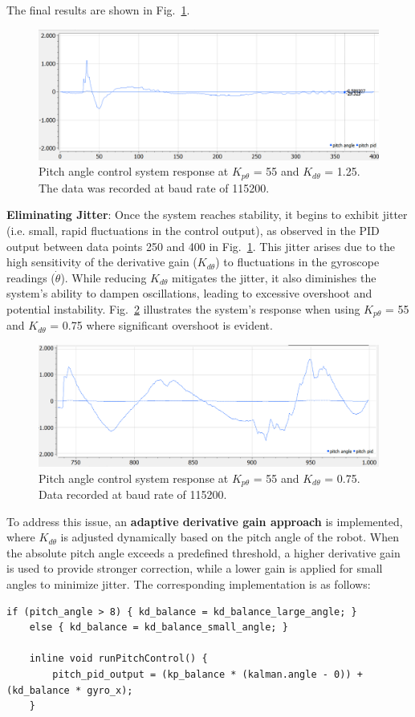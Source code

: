 The final results are shown in Fig.~\ref{fig:pid_position_kp_55_kd_1_25}.
\begin{figure}[H]
	\centering
	\includegraphics[width=0.8\linewidth]{assets/pid_pitch_kp_55_kd_1_25.png}
	\caption{Pitch angle control system response at $K_{p\theta}$ = 55 and $K_{d\theta}$ = 1.25. The data was recorded at baud rate of 115200.}
	\label{fig:pid_position_kp_55_kd_1_25}
\end{figure}

\textbf{Eliminating Jitter}:
Once the system reaches stability, it begins to exhibit jitter (i.e. small, rapid fluctuations in the control output), as observed in the PID output between data points 250 and 400 in Fig.~\ref{fig:pid_position_kp_55_kd_1_25}. This jitter arises due to the high sensitivity of the derivative gain ($K_{d\theta}$) to fluctuations in the gyroscope readings ($\dot{\theta}$). While reducing $K_{d\theta}$ mitigates the jitter, it also diminishes the system's ability to dampen oscillations, leading to excessive overshoot and potential instability. Fig.~\ref{fig:pid_position_overshoot} illustrates the system's response when using $K_{p\theta}$ = 55 and $K_{d\theta}$ = 0.75 where significant overshoot is evident.

\begin{figure}[H]
	\centering
	\includegraphics[width=0.7\linewidth]{assets/pid_pitch_overshoot.png}
	\caption{Pitch angle control system response at $K_{p\theta}$ = 55 and $K_{d\theta}$ = 0.75. Data recorded at baud rate of 115200.}
	\label{fig:pid_position_overshoot}
\end{figure}

To address this issue, an \textbf{adaptive derivative gain approach} is implemented, where $K_{d\theta}$ is adjusted dynamically based on the pitch angle of the robot. When the absolute pitch angle exceeds a predefined threshold, a higher derivative gain is used to provide stronger correction, while a lower gain is applied for small angles to minimize jitter. The corresponding implementation is as follows:
\begin{lstlisting}[style=cppstyle2]
	if (pitch_angle > 8) { kd_balance = kd_balance_large_angle; }
	else { kd_balance = kd_balance_small_angle; }
	
	inline void runPitchControl() {
		pitch_pid_output = (kp_balance * (kalman.angle - 0)) + (kd_balance * gyro_x);
	}
\end{lstlisting}


